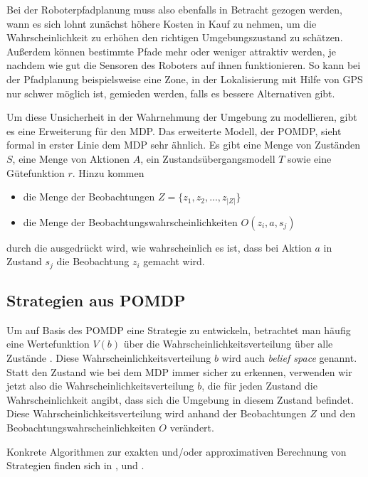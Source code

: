 \documentclass[a4paper]{IEEEtran}
\begin{document}
Bei der Roboterpfadplanung muss also ebenfalls in Betracht gezogen werden, wann es sich lohnt zunächst höhere Kosten in Kauf zu nehmen, um die Wahrscheinlichkeit zu erhöhen den richtigen Umgebungszustand zu schätzen. Außerdem können bestimmte Pfade mehr oder weniger attraktiv werden, je nachdem wie gut die Sensoren des Roboters auf ihnen funktionieren. So kann bei der Pfadplanung beispielsweise eine Zone, in der Lokalisierung mit Hilfe von GPS nur schwer möglich ist, gemieden werden, falls es bessere Alternativen gibt.

Um diese Unsicherheit in der Wahrnehmung der Umgebung zu modellieren, gibt es eine Erweiterung für den MDP. Das erweiterte Modell, der POMDP, sieht formal in erster Linie dem MDP sehr ähnlich. Es gibt eine Menge von Zuständen $S$, eine Menge von Aktionen $A$, ein Zustandsübergangsmodell $T$ sowie eine Gütefunktion $r$. Hinzu kommen
\begin{itemize}
	\item die Menge der Beobachtungen $Z = \{z_1, z_2, ..., z_{|Z|}\}$
	\item die Menge der Beobachtungswahrscheinlichkeiten $O(z_i, a, s_j)$
\end{itemize}
durch die ausgedrückt wird, wie wahrscheinlich es ist, dass bei Aktion $a$ in Zustand $s_j$ die Beobachtung $z_i$ gemacht wird.

\subsection{Strategien aus POMDP}
Um auf Basis des POMDP eine Strategie zu entwickeln, betrachtet man häufig eine Wertefunktion $V(b)$ über die Wahrscheinlichkeitsverteilung über alle Zustände \cite{roy2005finding}. Diese Wahrscheinlichkeitsverteilung $b$ wird auch \emph{belief space} genannt. Statt den Zustand wie bei dem MDP immer sicher zu erkennen, verwenden wir jetzt also die Wahrscheinlichkeitsverteilung $b$, die für jeden Zustand die Wahrscheinlichkeit angibt, dass sich die Umgebung in diesem Zustand befindet. Diese Wahrscheinlichkeitsverteilung wird anhand der Beobachtungen $Z$ und den Beobachtungswahrscheinlichkeiten $O$ verändert.

Konkrete Algorithmen zur exakten und/oder approximativen Berechnung von Strategien finden sich in \cite{cassandra1995acting}, \cite{roy2005finding} und \cite{thrun2005probabilistic}.



\end{document}
